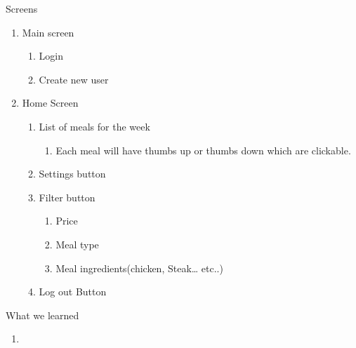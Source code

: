 \documentclass[a4paper,10pt,toc=graduated]{article}
\begin{document}
 
\begin{mySubsection}{Screens}
\renewcommand{\labelenumi}{\arabic{enumi}. }
\renewcommand{\labelenumii}{\arabic{enumi}.\arabic{enumii}. }
\renewcommand{\labelenumiii}{\arabic{enumi}.\arabic{enumii}.\arabic{enumiii}. }
\renewcommand{\labelenumiv}{\arabic{enumi}.\arabic{enumii}.\arabic{enumiii}. }
\renewcommand{\labelenumiv}{\arabic{enumi}.\arabic{enumii}.\arabic{enumiii}.\arabic{enumiv}. }
\begin{enumerate}
\item
Main screen
\begin{enumerate}
\item
Login
\item
Create new user
\end{enumerate}
\item
Home Screen
\begin{enumerate}
\item
List of meals for the week
\begin{enumerate}
\item
Each meal will have thumbs up or thumbs down which are clickable.
\end{enumerate}
\item
Settings button
\item
Filter button
\begin{enumerate}
\item
Price
\item
Meal type
\item
Meal ingredients(chicken, Steak… etc..)
\end{enumerate}
\item
Log out Button
\end{enumerate}
\end{enumerate}
\end{mySubsection}
\begin{mySubsection}{What we learned}
\begin{enumerate}
\item 
\end{enumerate}
\end{mySubsection}
\end{document}
